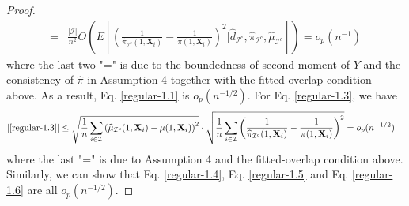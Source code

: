 \documentclass[11pt]{article}
\theoremstyle{referenceplain}
\theoremstyle{referencedefinition}
\theoremstyle{referenceremark}
\begin{document}
\begin{proof}
\begin{align*}
       =&\frac{|\mathcal{I}|}{n^2} O\left(E\left[\left(\frac{1}{\widehat{\pi}_{\mathcal{I}^c}(1,\mathbf{X}_i)}-\frac{1}{\pi(1,\mathbf{X}_i)}\right)^2\bigg|\widehat{d}_{\mathcal{I}^c}, \widehat{\pi}_{\mathcal{I}^c}, \widehat{\mu}_{\mathcal{I}^c}\right]\right)=o_p(n^{-1})
    \end{align*}
    where the last two "=" is due to the boundedness of second moment of $Y$ and the consistency of $\widehat{\pi}$ in Assumption 4 {together with the fitted-overlap condition above}.  As a result, Eq. \eqref{regular-1.1} is $o_p(n^{-1/2})$. For Eq. \eqref{regular-1.3}, we have
    \begin{align*}
       &|\eqref{regular-1.3}|
       \leq \sqrt{\frac{1}{n}\sum_{i\in\mathcal{I}}\left(\widehat{\mu}_{\mathcal{I}^c}(1,\mathbf{X}_i)-\mu(1,\mathbf{X}_i)\right)^2}\cdot\sqrt{\frac{1}{n}\sum_{i\in\mathcal{I}}\left(\frac{1}{\widehat{\pi}_{\mathcal{I}^c}(1,\mathbf{X}_i)}-\frac{1}{\pi(1,\mathbf{X}_i)}\right)^2}=o_p(n^{-1/2})
    \end{align*}
    where the last "=" is due to Assumption 4 {and the fitted-overlap condition above}. Similarly, we can show that Eq. \eqref{regular-1.4}, Eq. \eqref{regular-1.5} and Eq. \eqref{regular-1.6} are all $o_p(n^{-1/2})$.


\end{proof}
\end{document}
